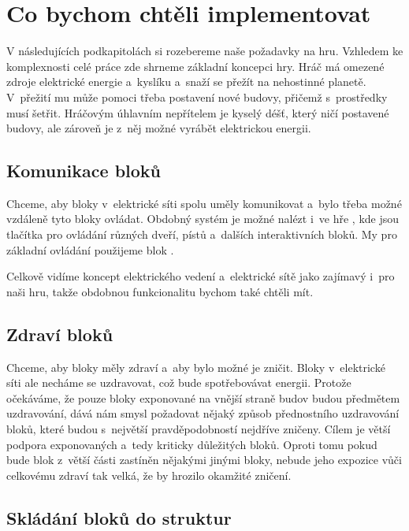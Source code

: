 


\section{Co bychom chtěli implementovat}

V následujících podkapitolách si rozebereme naše požadavky na hru. Vzhledem ke komplexnosti celé práce zde shrneme základní koncepci hry. Hráč má omezené zdroje elektrické energie a~kyslíku a~snaží se přežít na nehostinné planetě. V~přežití mu může pomoci třeba postavení nové budovy, přičemž s~prostředky musí šetřit. Hráčovým úhlavním nepřítelem je kyselý déšť, který ničí postavené budovy, ale zároveň je z~něj možné vyrábět elektrickou energii. 







\subsection{Komunikace bloků}

Chceme, aby bloky v~elektrické síti spolu uměly komunikovat a~bylo třeba možné vzdáleně tyto bloky ovládat. Obdobný systém je možné nalézt i~ve hře \SE{}, kde jsou tlačítka pro ovládání různých dveří, pístů a~dalších interaktivních bloků. My pro základní ovládání použijeme blok .


Celkově vidíme koncept elektrického vedení a~elektrické sítě jako zajímavý i~pro naši hru, takže obdobnou funkcionalitu bychom také chtěli mít.



\subsection{Zdraví bloků}
Chceme, aby bloky měly zdraví a~aby bylo možné je zničit. Bloky v~elektrické síti ale necháme se uzdravovat, což bude spotřebovávat energii. Protože očekáváme, že pouze bloky exponované na vnější straně budov budou předmětem uzdravování, dává nám smysl požadovat nějaký způsob přednostního uzdravování bloků, které budou s~největší pravděpodobností nejdříve zničeny. Cílem je větší podpora exponovaných a~tedy kriticky důležitých bloků. Oproti tomu pokud bude blok z~větší části zastíněn nějakými jinými bloky, nebude jeho expozice vůči celkovému zdraví tak velká, že by hrozilo okamžité zničení.

\subsection{Skládání bloků do struktur}

